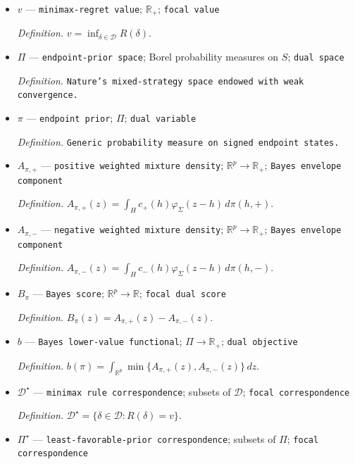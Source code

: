 \documentclass{article}
\begin{document}
\begin{itemize}
  \item \(v\) --- \texttt{minimax-\allowbreak{}regret value}; \(\mathbb R_{+}\); \texttt{focal value}
  \par\smallskip\noindent\emph{Definition.} \(v=\inf_{\delta\in\mathcal D}R(\delta)\).
  \item \(\Pi\) --- \texttt{endpoint-\allowbreak{}prior space}; Borel probability measures on \(S\); \texttt{dual space}
  \par\smallskip\noindent\emph{Definition.} \texttt{Nature's mixed-\allowbreak{}strategy space endowed with weak convergence.}
  \item \(\pi\) --- \texttt{endpoint prior}; \(\Pi\); \texttt{dual variable}
  \par\smallskip\noindent\emph{Definition.} \texttt{Generic probability measure on signed endpoint states.}
  \item \(A_{\pi,+}\) --- \texttt{positive weighted mixture density}; \(\mathbb R^{p}\to\mathbb R_{+}\); \texttt{Bayes envelope component}
  \par\smallskip\noindent\emph{Definition.} \(A_{\pi,+}(z)=\int_H c_{+}(h)\varphi_{\Sigma}(z-h)\,d\pi(h,+)\).
  \item \(A_{\pi,-}\) --- \texttt{negative weighted mixture density}; \(\mathbb R^{p}\to\mathbb R_{+}\); \texttt{Bayes envelope component}
  \par\smallskip\noindent\emph{Definition.} \(A_{\pi,-}(z)=\int_H c_{-}(h)\varphi_{\Sigma}(z-h)\,d\pi(h,-)\).
  \item \(B_{\pi}\) --- \texttt{Bayes score}; \(\mathbb R^{p}\to\mathbb R\); \texttt{focal dual score}
  \par\smallskip\noindent\emph{Definition.} \(B_{\pi}(z)=A_{\pi,+}(z)-A_{\pi,-}(z)\).
  \item \(b\) --- \texttt{Bayes lower-\allowbreak{}value functional}; \(\Pi\to\mathbb R_{+}\); \texttt{dual objective}
  \par\smallskip\noindent\emph{Definition.} \(b(\pi)=\int_{\mathbb R^p}\min\{A_{\pi,+}(z),A_{\pi,-}(z)\}\,dz\).
  \item \(\mathcal D^{\star}\) --- \texttt{minimax rule correspondence}; subsets of \(\mathcal D\); \texttt{focal correspondence}
  \par\smallskip\noindent\emph{Definition.} \(\mathcal D^{\star}=\{\delta\in\mathcal D:R(\delta)=v\}\).
  \item \(\Pi^{\star}\) --- \texttt{least-\allowbreak{}favorable-\allowbreak{}prior correspondence}; subsets of \(\Pi\); \texttt{focal correspondence}

\end{itemize}
\end{document}
